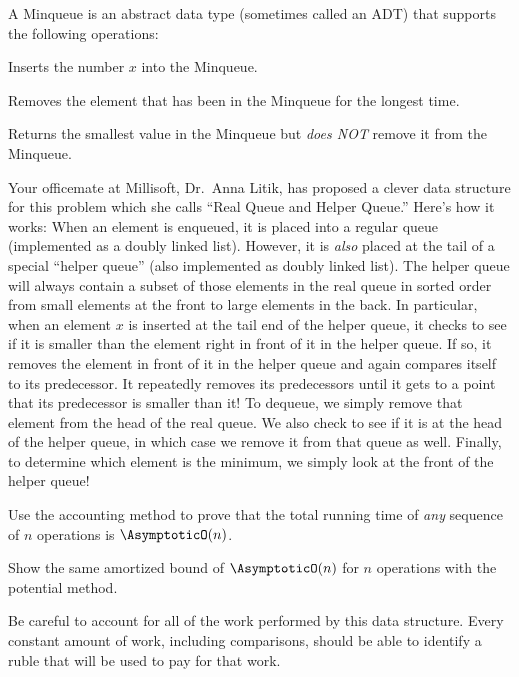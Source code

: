 \documentclass{ks-pset}
\begin{document}
\begin{problem}[Minqueues!, 35]

  A Minqueue is an abstract data type (sometimes called an ADT) that supports
  the following operations:

  \begin{description}[nosep]
    \item[\(\Ident{enqueue}(x)\)] Inserts the number \(x\) into the Minqueue.
    \item[\(\Ident{dequeue}()\)] Removes the element that has been in the
      Minqueue for the longest time.
    \item[\(\Ident{find_min}()\)] Returns the smallest value in the Minqueue
      but \emph{does NOT} remove it from the Minqueue.
  \end{description}

  Your officemate at Millisoft, Dr.~Anna Litik, has proposed a clever data
  structure for this problem which she calls ``Real Queue and Helper Queue.''
  Here's how it works:  When an element is enqueued, it is placed into a
  regular queue (implemented as a doubly linked list).  However, it is
  \emph{also} placed at the tail of a special ``helper queue'' (also
  implemented as doubly linked list).  The helper queue will always contain a
  subset of those elements in the real queue in sorted order from small
  elements at the front to large elements in the back.  In particular, when an
  element \(x\) is inserted at the tail end of the helper queue, it checks to
  see if it is smaller than the element right in front of it in the helper
  queue.  If so, it removes the element in front of it in the helper queue and
  again compares itself to its predecessor.  It repeatedly removes its
  predecessors until it gets to a point that its predecessor is smaller than
  it!  To dequeue, we simply remove that element from the head of the real
  queue.  We also check to see if it is at the head of the helper queue, in
  which case we remove it from that queue as well.  Finally, to determine which
  element is the minimum, we simply look at the front of the helper queue!

  \begin{subproblems}
    \item Use the accounting method to prove that the total running time of
      \emph{any} sequence of \(n\) operations is \(\AsymptoticO(n)\).
    \item Show the same amortized bound of \(\AsymptoticO(n)\) for \(n\)
      operations with the potential method.
  \end{subproblems}

  \begin{hint}
    Be careful to account for all of the work performed by this data structure.
    Every constant amount of work, including comparisons, should be able to
    identify a ruble that will be used to pay for that work.
  \end{hint}

\end{problem}
\end{document}

